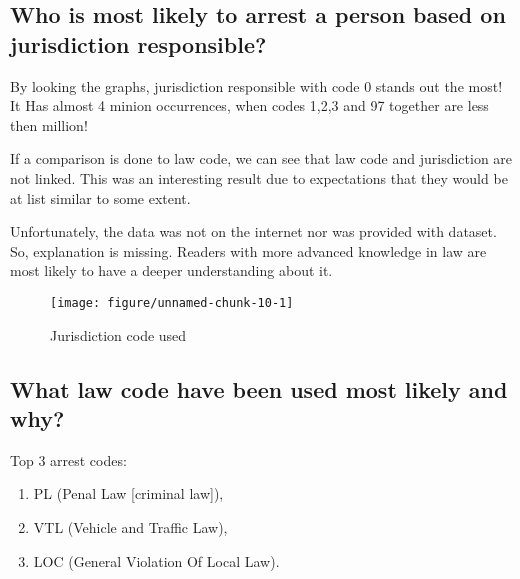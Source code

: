 \documentclass{article}\usepackage[]{graphicx}\usepackage[]{color}
\makeatletter
\def\maxwidth{ %
  \ifdim\Gin@nat@width>\linewidth
    \linewidth
  \else
    \Gin@nat@width
  \fi
}
\newenvironment{kframe}{%
 \def\at@end@of@kframe{}%
 \ifinner\ifhmode%
  \def\at@end@of@kframe{\end{minipage}}%
  \begin{minipage}{\columnwidth}%
 \fi\fi%
 \def\FrameCommand##1{\hskip\@totalleftmargin \hskip-\fboxsep
 \colorbox{shadecolor}{##1}\hskip-\fboxsep
     \hskip-\linewidth \hskip-\@totalleftmargin \hskip\columnwidth}%
 \MakeFramed {\advance\hsize-\width
   \@totalleftmargin\z@ \linewidth\hsize
   \@setminipage}}%
 {\par\unskip\endMakeFramed%
 \at@end@of@kframe}
\newenvironment{knitrout}{}{} %
\makeatother
\begin{document}
  \maketitle
    \newpage
      \subsection{Who is most likely to arrest a person based on jurisdiction responsible?}
      By looking the graphs, jurisdiction responsible with code 0 stands out the most! It Has almost 4          minion occurrences, when codes 1,2,3 and 97 together are less then million!\

      If a comparison is done to law code, we can see that law code and jurisdiction are not linked. This       was an interesting result due to expectations that they would be at list similar to some extent.\

      Unfortunately, the data was not on the internet nor was provided with dataset. So, explanation is         missing. Readers with more advanced knowledge in law are most likely to have a deeper understanding       about it.

        \begin{figure}[hbtp]
          \caption{Jurisdiction code used}
\begin{knitrout}
\color{fgcolor}\begin{kframe}


{\ttfamily\noindent\bfseries{}}\end{kframe}
\texttt{[image: figure/unnamed-chunk-10-1]} 

\end{knitrout}
        \end{figure}
        
    \newpage
      \subsection{What law code have been used most likely and why?}
        Top 3 arrest codes:
        \begin{enumerate}
          \item
            PL (Penal Law [criminal law]),
          \item
            VTL (Vehicle and Traffic Law),
          \item
          	LOC (General Violation Of Local Law).
        \end{enumerate}
\end{document}
